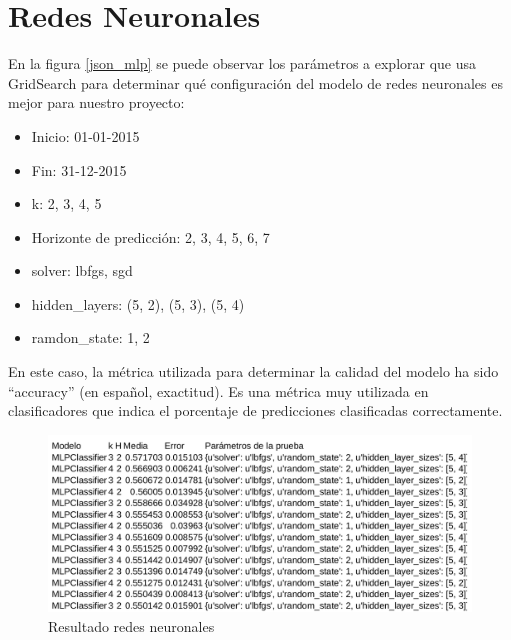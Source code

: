 

\section{Redes Neuronales}
\label{makereference7.3}

En la figura \ref{json_mlp} se puede observar los parámetros a explorar que usa GridSearch para determinar qué configuración del modelo de redes neuronales es mejor para nuestro proyecto:

\begin{itemize}
\item Inicio: 01-01-2015
\item Fin: 31-12-2015
\item k: 2, 3, 4, 5
\item Horizonte de predicción: 2, 3, 4, 5, 6, 7
\item solver: lbfgs, sgd
\item hidden\_layers: (5, 2), (5, 3), (5, 4)
\item ramdon\_state: 1, 2
\end{itemize}

En este caso, la métrica utilizada para determinar la calidad del modelo ha sido ``accuracy'' (en español, exactitud). Es una métrica muy utilizada en clasificadores que indica el porcentaje de predicciones clasificadas correctamente.

\begin{figure}[htb]
	\begin{center}
		\includegraphics[width=17cm]{figures/resultado_mlp.png}
		\caption{Resultado redes neuronales \label{resultado_mlp}}
	\end{center}
\end{figure}

